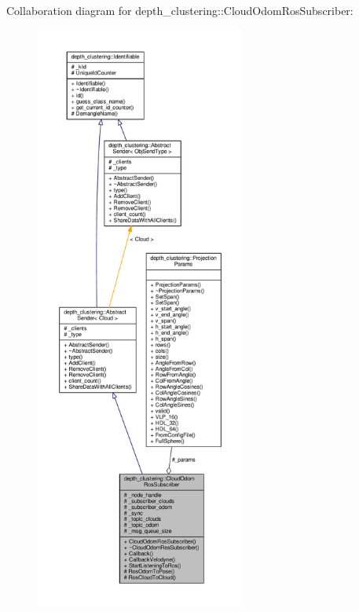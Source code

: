 Collaboration diagram for depth\-\_\-clustering\-:\-:Cloud\-Odom\-Ros\-Subscriber\-:
\nopagebreak
\begin{figure}[H]
\begin{center}
\leavevmode
\includegraphics[height=550pt]{classdepth__clustering_1_1CloudOdomRosSubscriber__coll__graph}
\end{center}
\end{figure}


